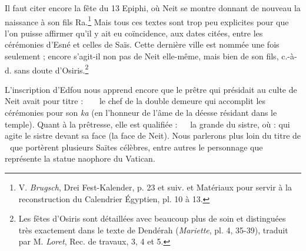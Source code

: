 \documentclass[letterpaper,twocolumn,openany,nodeprecatedcode]{dndbook}
\newcommand*\hieroAABA{}
\newcommand*\hieroAACS{}
\newcommand*\hieroAACY{}
\newcommand*\hieroAAHK{}
\newcommand*\hieroAANP{}
\newcommand*\hieroAAOR{}
\newcommand*\hieroAAOS{}
\newcommand*\hieroAAOT{}
\newcommand*\hieroAAOU{}
\newcommand*\hieroAAOV{}
\newcommand*\hieroAAOW{}
\newcommand*\hieroAAOX{}
\newcommand*\hieroAAOY{\raisebox{0.3ex}{}}
\begin{document}
Il faut citer encore la fête du 13 Epiphi, où Neit se montre donnant de nouveau la naissance à son fils Ra.\footnote{V. \emph{Brugsch}, Drei Fest-Kalender, p. 23 et suiv. et Matériaux pour servir à la reconstruction du Calendrier Égyptien, pl. 10 à 13.} Mais tous ces textes sont trop peu explicites pour que l'on puisse affirmer qu'il y ait eu coïncidence, aux dates citées, entre les cérémonies d'Esné et celles de Saïs. Cette dernière ville est nommée une fois seulement ; encore s'agit-il non pas de Neit elle-même, mais bien de son fils, c.-à-d. sans doute d'Osiris.\footnote{Les fêtes d'Osiris sont détaillées avec beaucoup plus de soin et distinguées très exactement dans le texte de Dendérah (\emph{Mariette}, pl. 4, 35-39), traduit par M. \emph{Loret}, Rec. de travaux, 3, 4 et 5.}

L'inscription d'Edfou nous apprend encore que le prêtre qui présidait au culte de Neit avait pour titre : $\hieroAAHK\:\hieroAAOR\:\hieroAAHK\allowbreak\:\hieroAAOS\:\hieroAAOT\allowbreak\:\hieroAAOU\:\hieroAACS$ le chef de la double demeure qui accomplit les cérémonies pour son \emph{ka} (en l'honneur de l'âme de la déesse résidant dans le temple). Quant à la prêtresse, elle est qualifiée : $\hieroAABA\:\hieroAACY\:\hieroAAOV\allowbreak\:\hieroAANP\:\hieroAAOW$ la grande du sistre, où : qui agite le sistre devant sa face (la face de Neit). Nous parlerons plus loin du titre de $\hieroAAOX\:\hieroAAOY$ que portèrent plusieurs Saïtes célèbres, entre autres le personnage que représente la statue naophore du Vatican.
\end{document}
